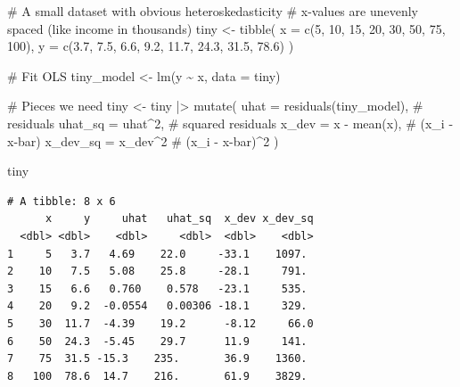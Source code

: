 \documentclass[
  letterpaper,
  DIV=11,
  numbers=noendperiod]{scrreprt}
\newenvironment{Shaded}{\begin{snugshade}}{\end{snugshade}}
\newcommand{\AttributeTok}[1]{\textcolor[rgb]{0.40,0.45,0.13}{#1}}
\newcommand{\CommentTok}[1]{\textcolor[rgb]{0.37,0.37,0.37}{#1}}
\newcommand{\DecValTok}[1]{\textcolor[rgb]{0.68,0.00,0.00}{#1}}
\newcommand{\FloatTok}[1]{\textcolor[rgb]{0.68,0.00,0.00}{#1}}
\newcommand{\FunctionTok}[1]{\textcolor[rgb]{0.28,0.35,0.67}{#1}}
\newcommand{\NormalTok}[1]{\textcolor[rgb]{0.00,0.23,0.31}{#1}}
\newcommand{\OtherTok}[1]{\textcolor[rgb]{0.00,0.23,0.31}{#1}}
\newcommand{\SpecialCharTok}[1]{\textcolor[rgb]{0.37,0.37,0.37}{#1}}
\begin{document}
\begin{Shaded}
\begin{Highlighting}[]
\CommentTok{\# A small dataset with obvious heteroskedasticity}
\CommentTok{\# x{-}values are unevenly spaced (like income in thousands)}
\NormalTok{tiny }\OtherTok{\textless{}{-}} \FunctionTok{tibble}\NormalTok{(}
    \AttributeTok{x =} \FunctionTok{c}\NormalTok{(}\DecValTok{5}\NormalTok{, }\DecValTok{10}\NormalTok{, }\DecValTok{15}\NormalTok{, }\DecValTok{20}\NormalTok{, }\DecValTok{30}\NormalTok{, }\DecValTok{50}\NormalTok{, }\DecValTok{75}\NormalTok{, }\DecValTok{100}\NormalTok{),}
    \AttributeTok{y =} \FunctionTok{c}\NormalTok{(}\FloatTok{3.7}\NormalTok{, }\FloatTok{7.5}\NormalTok{, }\FloatTok{6.6}\NormalTok{, }\FloatTok{9.2}\NormalTok{, }\FloatTok{11.7}\NormalTok{, }\FloatTok{24.3}\NormalTok{, }\FloatTok{31.5}\NormalTok{, }\FloatTok{78.6}\NormalTok{)}
\NormalTok{)}

\CommentTok{\# Fit OLS}
\NormalTok{tiny\_model }\OtherTok{\textless{}{-}} \FunctionTok{lm}\NormalTok{(y }\SpecialCharTok{\textasciitilde{}}\NormalTok{ x, }\AttributeTok{data =}\NormalTok{ tiny)}

\CommentTok{\# Pieces we need}
\NormalTok{tiny }\OtherTok{\textless{}{-}}\NormalTok{ tiny }\SpecialCharTok{|\textgreater{}}
    \FunctionTok{mutate}\NormalTok{(}
        \AttributeTok{uhat    =} \FunctionTok{residuals}\NormalTok{(tiny\_model),       }\CommentTok{\# residuals}
        \AttributeTok{uhat\_sq =}\NormalTok{ uhat}\SpecialCharTok{\^{}}\DecValTok{2}\NormalTok{,                      }\CommentTok{\# squared residuals}
        \AttributeTok{x\_dev   =}\NormalTok{ x }\SpecialCharTok{{-}} \FunctionTok{mean}\NormalTok{(x),                 }\CommentTok{\# (x\_i {-} x{-}bar)}
        \AttributeTok{x\_dev\_sq =}\NormalTok{ x\_dev}\SpecialCharTok{\^{}}\DecValTok{2}                     \CommentTok{\# (x\_i {-} x{-}bar)\^{}2}
\NormalTok{    )}

\NormalTok{tiny}
\end{Highlighting}
\end{Shaded}

\begin{verbatim}
# A tibble: 8 x 6
      x     y     uhat   uhat_sq  x_dev x_dev_sq
  <dbl> <dbl>    <dbl>     <dbl>  <dbl>    <dbl>
1     5   3.7   4.69    22.0     -33.1    1097. 
2    10   7.5   5.08    25.8     -28.1     791. 
3    15   6.6   0.760    0.578   -23.1     535. 
4    20   9.2  -0.0554   0.00306 -18.1     329. 
5    30  11.7  -4.39    19.2      -8.12     66.0
6    50  24.3  -5.45    29.7      11.9     141. 
7    75  31.5 -15.3    235.       36.9    1360. 
8   100  78.6  14.7    216.       61.9    3829. 
\end{verbatim}
\end{document}
